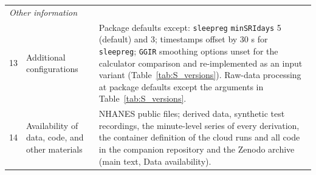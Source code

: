 {\begin{longtable}{p{}p{}p{}}
\multicolumn{3}{l}{\emph{Other information}} \\
13 & Additional configurations & Package defaults except: \texttt{sleepreg} \texttt{minSRIdays} 5 (default) and 3; timestamps offset by 30 s for \texttt{sleepreg}; \texttt{GGIR} smoothing options unset for the calculator comparison and re-implemented as an input variant (Table~\ref{tab:S_versions}). Raw-data processing at package defaults except the arguments in Table~\ref{tab:S_versions}. \\
14 & Availability of data, code, and other materials & NHANES public files; derived data, synthetic test recordings, the minute-level series of every derivation, the container definition of the cloud runs and all code in the companion repository and the Zenodo archive (main text, Data availability). \\
\end{longtable}}
